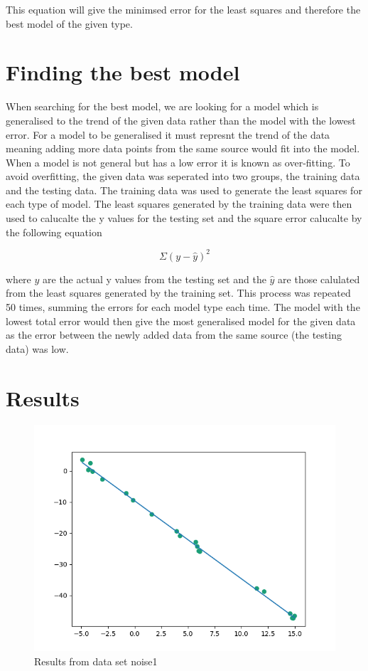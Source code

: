 \documentclass[]{article}
\begin{document}
This equation will give the minimsed error for the least squares and therefore
the best model of the given type.

\section{Finding the best model}

When searching for the best model, we are looking for a model which is
generalised to the trend of the given data rather than the model with the lowest error. For a model to be
generalised it must represnt the trend of the data meaning adding more data
points from the same source would fit into the model. When a model is not
general but has a low error it is known as over-fitting. To avoid overfitting, the given data was seperated
into two groups, the training data and the testing data. The training data was
used to generate the least squares for each type of model. The least squares
generated by the training data were then used to calucalte the y values for the
testing set and the square error calucalte by the following equation

\begin{equation}
  \Sigma (y - \hat{y})^2
\end {equation}

where $y$ are the actual y values from the testing set and the $\hat{y}$ are
those calulated from the least squares generated by the training set. This
process was repeated 50 times, summing the errors for each model
type each time. The model with the lowest total error would then give the most
generalised model for the given data as the error between
the newly added data from the same source (the testing data) was low.

\section{Results}

\begin{figure}[th!]
  \includegraphics[scale=0.5]{noise.png}
  \centering
  \caption {Results from data set noise1}
  \label{fig:noise1}
\end{figure}
\end{document}
